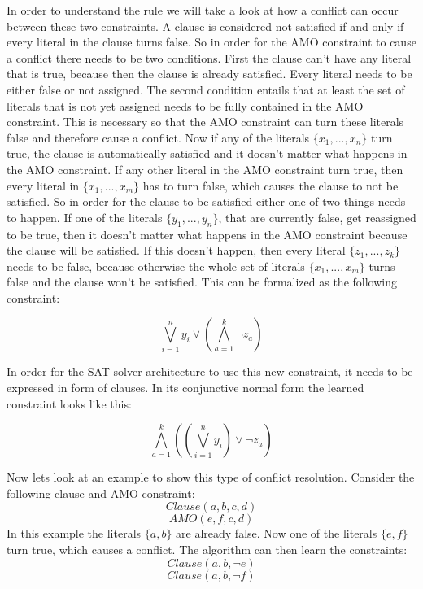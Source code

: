 In order to understand the rule we will take a look at how a conflict can occur between these two constraints. A clause is considered not satisfied if and only if every literal in the clause turns false. So in order for the AMO constraint to cause a conflict there needs to be two conditions. First the clause can't have any literal that is true, because then the clause is already satisfied. Every literal needs to be either false or not assigned. The second condition entails that at least the set of literals that is not yet assigned needs to be fully contained in the AMO constraint. This is necessary so that the AMO constraint can turn these literals false and therefore cause a conflict.
Now if any of the literals $\{x_1,...,x_n\}$ turn true, the clause is automatically satisfied and it doesn't matter what happens in the AMO constraint. If any other literal in the AMO constraint turn true, then every literal in $\{x_1,...,x_m\}$ has to turn false, which causes the clause to not be satisfied. So in order for the clause to be satisfied either one of two things needs to happen. If one of the literals $\{y_1,...,y_n\}$, that are currently false, get reassigned to be true, then it doesn't matter what happens in the AMO constraint because the clause will be satisfied. If this doesn't happen, then every literal $\{z_1,...,z_k\}$ needs to be false, because otherwise the whole set of literals $\{x_1,...,x_m\}$ turns false and the clause won't be satisfied. This can be formalized as the following constraint:
\begin{leftbar}
\begin{displaymath}
\bigvee_{i=1}^{n}y_i \vee (\bigwedge_{a=1}^{k}\neg z_a)
\end{displaymath}
\end{leftbar}
In order for the SAT solver architecture to use this new constraint, it needs to be expressed in form of clauses. In its conjunctive normal form the learned constraint looks like this:
\begin{leftbar}
\begin{displaymath}
\bigwedge_{a=1}^{k}((\bigvee_{i=1}^{n}y_i)\vee \neg z_a)
\end{displaymath}
\end{leftbar}

Now lets look at an example to show this type of conflict resolution. Consider the following clause and AMO constraint:
\begin{displaymath}
Clause(a,b,c,d)
\end{displaymath}
\begin{displaymath}
AMO(e,f,c,d)
\end{displaymath}
In this example the literals $\{a,b\}$ are already false. Now one of the literals $\{e,f\}$ turn true, which causes a conflict. The algorithm can then learn the constraints:
\begin{displaymath}
Clause(a,b,\neg e)
\end{displaymath}
\begin{displaymath}
Clause(a,b,\neg f)
\end{displaymath}

